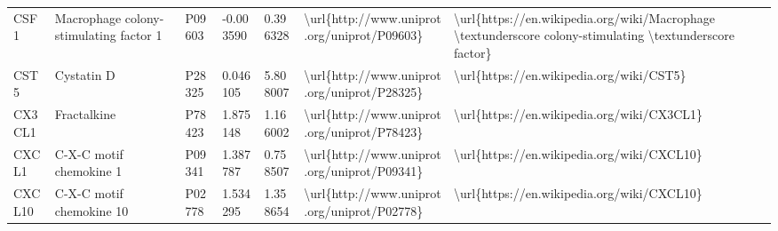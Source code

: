 \begin{table}[]
\begin{tabular}{lllllll}
\multicolumn{1}{l|}{CSF1}     & Macrophage colony-stimulating factor 1                        & P09603  & -0.003590          & 0.396328          & \textbackslash{}url\{http://www.uniprot.org/uniprot/P09603\} & \textbackslash{}url\{https://en.wikipedia.org/wiki/Macrophage \textbackslash{}textunderscore colony-stimulating \textbackslash{}textunderscore factor\}                                                                                                                                            \\
\multicolumn{1}{l|}{CST5}     & Cystatin D                                                    & P28325  & 0.046105           & 5.808007          & \textbackslash{}url\{http://www.uniprot.org/uniprot/P28325\} & \textbackslash{}url\{https://en.wikipedia.org/wiki/CST5\}                                                                                                                                                                                                                                          \\
\multicolumn{1}{l|}{CX3CL1}   & Fractalkine                                                   & P78423  & 1.875148           & 1.166002          & \textbackslash{}url\{http://www.uniprot.org/uniprot/P78423\} & \textbackslash{}url\{https://en.wikipedia.org/wiki/CX3CL1\}                                                                                                                                                                                                                                        \\
\multicolumn{1}{l|}{CXCL1}    & C-X-C motif chemokine 1                                       & P09341  & 1.387787           & 0.758507          & \textbackslash{}url\{http://www.uniprot.org/uniprot/P09341\} & \textbackslash{}url\{https://en.wikipedia.org/wiki/CXCL10\}                                                                                                                                                                                                                                        \\
\multicolumn{1}{l|}{CXCL10}   & C-X-C motif chemokine 10                                      & P02778  & 1.534295           & 1.358654          & \textbackslash{}url\{http://www.uniprot.org/uniprot/P02778\} & \textbackslash{}url\{https://en.wikipedia.org/wiki/CXCL10\}                                                                                                                                                                                                                                        \\

\end{tabular}
\end{table}
